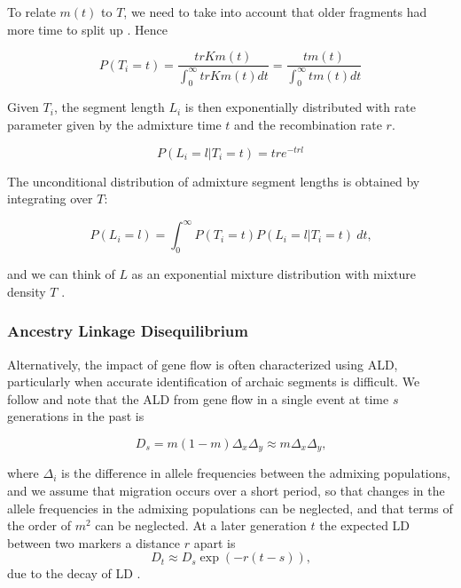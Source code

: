 \documentclass[11pt]{article}
\begin{document}
To relate $m(t)$ to $T$, we need to take into account that older fragments had more time to split up \citep{pool_inference_2009}. Hence

\begin{equation}
	P(T_i=t) = \frac{t r K m(t)}{\int_0^{\infty} t r K  m(t) dt} = \frac{t m(t)}{\int_0^{\infty} t m(t) dt} \label{eq:reweighting}
\end{equation}


Given $T_i$, the segment length $L_i$ is then exponentially distributed with rate parameter given by the admixture time $t$ and the recombination rate $r$.

\begin{equation}
 \label{eq:generall_length_distribution}
    P(L_i=l|T_i=t) = t r e^{-t r l} 
\end{equation}
	
	
The unconditional distribution of admixture segment lengths is obtained by integrating over $T$:
	
\begin{equation}
\label{eq:standard_likelihood_definintion}
    P(L_i=l)=\int_{0}^{\infty} P(T_i=t) P(L_i=l | T_i=t) \ dt \text{,}
\end{equation}
	
	
and we can think of $L$ as an exponential mixture distribution with mixture density $T$ \citep{ralph_geography_2013, zhou_modeling_2017}.
	
\subsubsection{Ancestry Linkage Disequilibrium}
Alternatively, the impact of gene flow is often characterized using ALD, particularly when accurate identification of archaic segments is difficult. We follow \cite{loh_inferring_2013} and note that the ALD from gene flow in a single event at time $s$ generations in the past is

\begin{equation}
    D_{s} = m(1-m)\Delta_x \Delta_y \approx m \Delta_x\Delta_y\text{,} \label{eq:ald_general}
\end{equation}

where $\Delta_i$ is the difference in allele frequencies between the admixing populations, and we assume that migration occurs over a short period, so that changes in the allele frequencies in the admixing populations can be neglected, and that terms of the order of $m^2$ can be neglected. At a later generation $t$ the expected LD between two markers a distance $r$ apart is
\begin{equation}
    D_t \approx D_s \exp(-r(t-s))\text{,}
\end{equation}
due to the decay of LD \cite[e.g.][]{sankararaman_date_2012}. 
\end{document}
